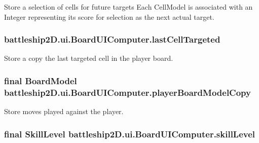 Store a selection of cells for future targets Each Cell\-Model is associated with an Integer representing its score for selection as the next actual target. 

\hypertarget{classbattleship2D_1_1ui_1_1BoardUIComputer_a0d4adb0bce02dfe3629b361edbb58ce0}{
\subsubsection[{last\-Cell\-Targeted}]{ battleship2\-D.\-ui.\-Board\-U\-I\-Computer.\-last\-Cell\-Targeted\hspace{0.3cm}{\ttfamily [private]}}}\label{classbattleship2D_1_1ui_1_1BoardUIComputer_a0d4adb0bce02dfe3629b361edbb58ce0}


Store a copy the last targeted cell in the player board. 

\hypertarget{classbattleship2D_1_1ui_1_1BoardUIComputer_a732fb169b5de8459716765e2196e0a13}{
\subsubsection[{player\-Board\-Model\-Copy}]{\setlength{\rightskip}{0pt plus 5cm}final {\bf Board\-Model} battleship2\-D.\-ui.\-Board\-U\-I\-Computer.\-player\-Board\-Model\-Copy\hspace{0.3cm}{\ttfamily [private]}}}\label{classbattleship2D_1_1ui_1_1BoardUIComputer_a732fb169b5de8459716765e2196e0a13}


Store moves played against the player. 

\hypertarget{classbattleship2D_1_1ui_1_1BoardUIComputer_a1c8d0fc4e6fd8ae9402dc45bee0fde2b}{
\subsubsection[{skill\-Level}]{\setlength{\rightskip}{0pt plus 5cm}final {\bf Skill\-Level} battleship2\-D.\-ui.\-Board\-U\-I\-Computer.\-skill\-Level\hspace{0.3cm}{\ttfamily [private]}}}\label{classbattleship2D_1_1ui_1_1BoardUIComputer_a1c8d0fc4e6fd8ae9402dc45bee0fde2b}


